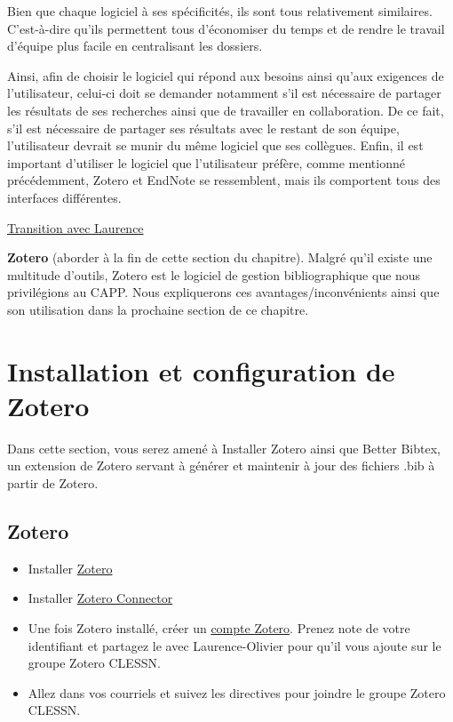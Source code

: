 \documentclass[
  letterpaper,
]{scrbook}
\begin{document}
Bien que chaque logiciel à ses spécificités, ils sont tous relativement
similaires. C'est-à-dire qu'ils permettent tous d'économiser du temps et
de rendre le travail d'équipe plus facile en centralisant les dossiers.

Ainsi, afin de choisir le logiciel qui répond aux besoins ainsi qu'aux
exigences de l'utilisateur, celui-ci doit se demander notamment s'il est
nécessaire de partager les résultats de ses recherches ainsi que de
travailler en collaboration. De ce fait, s'il est nécessaire de partager
ses résultats avec le restant de son équipe, l'utilisateur devrait se
munir du même logiciel que ses collègues. Enfin, il est important
d'utiliser le logiciel que l'utilisateur préfère, comme mentionné
précédemment, Zotero et EndNote se ressemblent, mais ils comportent tous
des interfaces différentes.

\ul{Transition avec Laurence}

\textbf{Zotero} (aborder à la fin de cette section du chapitre). Malgré
qu'il existe une multitude d'outils, Zotero est le logiciel de gestion
bibliographique que nous privilégions au CAPP. Nous expliquerons ces
avantages/inconvénients ainsi que son utilisation dans la prochaine
section de ce chapitre.

\hypertarget{installation-et-configuration-de-zotero}{%
\section{Installation et configuration de
Zotero}\label{installation-et-configuration-de-zotero}}

Dans cette section, vous serez amené à Installer Zotero ainsi que Better
Bibtex, un extension de Zotero servant à générer et maintenir à jour des
fichiers .bib à partir de Zotero.

\hypertarget{zotero}{%
\subsection{Zotero}\label{zotero}}

\begin{itemize}
\item
  Installer \href{https://www.zotero.org/download/}{Zotero}
\item
  Installer \href{https://www.zotero.org/download/}{Zotero Connector}
\item
  Une fois Zotero installé, créer un
  \href{https://www.zotero.org/user/register/}{compte Zotero}. Prenez
  note de votre identifiant et partagez le avec Laurence-Olivier pour
  qu'il vous ajoute sur le groupe Zotero CLESSN.
\item
  Allez dans vos courriels et suivez les directives pour joindre le
  groupe Zotero CLESSN.
\end{itemize}
\end{document}
